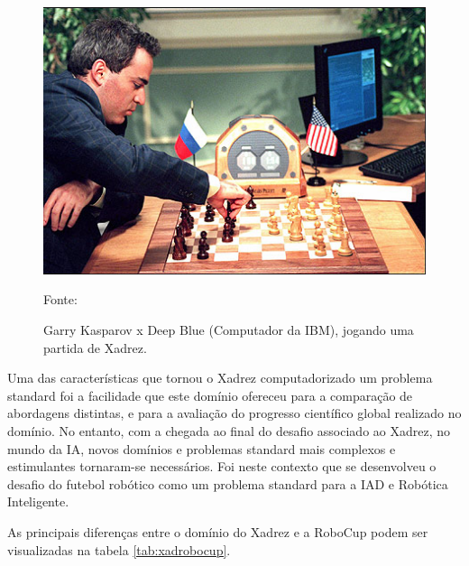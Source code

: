 \begin{figure}[h]

\centering

\includegraphics[scale=0.48]{figuras/deepblue.jpg}

\caption{Garry Kasparov x Deep Blue (Computador da IBM), jogando uma partida de Xadrez.} Fonte: \cite{flamencos} \label{fig:deepblue}

\end{figure}
\FloatBarrier


Uma das características que tornou o Xadrez computadorizado um problema standard foi a facilidade que este domínio ofereceu para
a comparação de abordagens distintas, e para a  avaliação do progresso científico global realizado no domínio. No entanto, com a
chegada ao final do desafio associado ao Xadrez, no mundo da IA, novos domínios e problemas standard mais complexos e estimulantes
tornaram-se necessários. Foi neste contexto que se desenvolveu o desafio do futebol robótico como um problema standard para a IAD 
e Robótica Inteligente. 

As principais diferenças entre o domínio do Xadrez e a RoboCup podem ser visualizadas na tabela \ref{tab:xadrobocup}.

